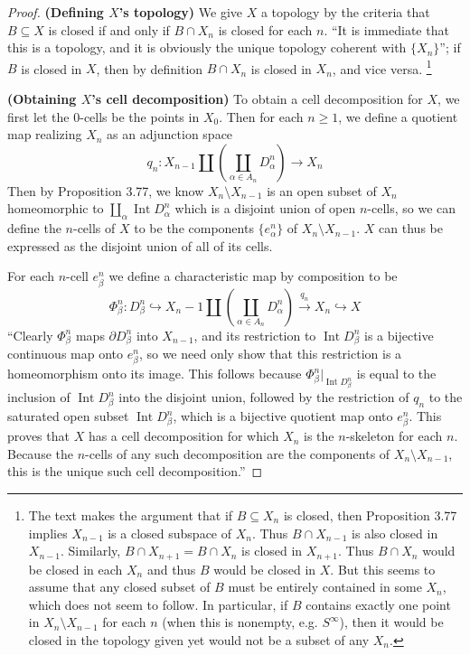\documentclass{article}
\theoremstyle{definition}
\newcommand{\p}[1]{\left(#1\right)}
\begin{document}
\begin{proof}
\textbf{(Defining $X$'s topology)}
We give $X$ a topology by the criteria that $B \subseteq X$ is closed if and only if
$B \cap X_n$ is closed for each $n$. ``It is immediate that this is a topology, and it is
obviously the unique topology coherent with $\{X_n\}$''; if $B$ is closed in $X$, then
by definition $B \cap X_n$ is closed in $X_n$, and vice versa.%
\footnote{The text makes the argument
that if $B \subseteq X_n$ is closed, then Proposition 3.77 implies $X_{n-1}$ is a closed
subspace of $X_n$. Thus $B \cap X_{n-1}$ is also closed in $X_{n-1}$. 
Similarly, $B \cap X_{n+1} = B \cap X_n$ is closed in $X_{n+1}$. Thus $B\cap X_n$ would
be closed in each $X_n$ and thus $B$ would be closed in $X$. But this seems to assume that
any closed subset of $B$ must be entirely contained in some $X_n$, which does not seem to
follow. In particular, if $B$ contains exactly one point in $X_n \setminus X_{n-1}$ for 
each $n$ (when this is nonempty, e.g. $S^\infty$), 
then it would be closed in the topology given yet would not be a subset of 
any $X_n$.}

\textbf{(Obtaining $X$'s cell decomposition)}
To obtain a cell decomposition for $X$, we first let the $0$-cells be the points in
$X_0$. Then for each $n \ge 1$, we define a quotient map realizing $X_n$ as an adjunction
space 
\[
q_n : X_{n-1} \amalg \p{ \coprod_{\alpha \in A_n} D_\alpha^n} \to X_n
\]
Then by Proposition 3.77, we know $X_n \setminus X_{n-1}$ is an open subset of $X_n$
homeomorphic to $\coprod_{\alpha} \operatorname{Int} D_\alpha^n$ which is a disjoint
union of open $n$-cells, so we can define the $n$-cells of $X$ to be the components
$\{ e_\alpha^n \}$
of $X_n \setminus X_{n-1}$. $X$ can thus be expressed as the disjoint union of all of
its cells.

For each $n$-cell $e_\beta^n$ we define a characteristic map by composition to be
\[
\Phi_\beta^n 
: D_\beta^n 
\hookrightarrow X_n-1 \amalg \p{ \coprod_{\alpha\in A_n} D_\alpha^n }
\overset{q_n}{\to} X_n
\hookrightarrow X
\]
``Clearly $\Phi_\beta^n$ maps $\partial D_\beta^n$ into $X_{n-1}$, and its restriction to 
$\operatorname{Int} D_\beta^n$ is a bijective continuous map onto $e_\beta^n$,
so we need only show that this restriction is a homeomorphism onto its image.
This follows because $\Phi_\beta^n|_{\operatorname{Int} D_\beta^n}$ is equal to
the inclusion of $\operatorname{Int} D_\beta^n$ into the disjoint union, followed by the 
restriction of $q_n$ to the saturated open subset $\operatorname{Int} D_\beta^n$,
which is a bijective quotient map onto $e_\beta^n$. This proves that $X$ has a cell 
decomposition for which $X_n$ is the $n$-skeleton for each $n$. Because the $n$-cells
of any such decomposition are the components of $X_n \setminus X_{n-1}$, this is the unique
such cell decomposition.''


\end{proof}
\end{document}
